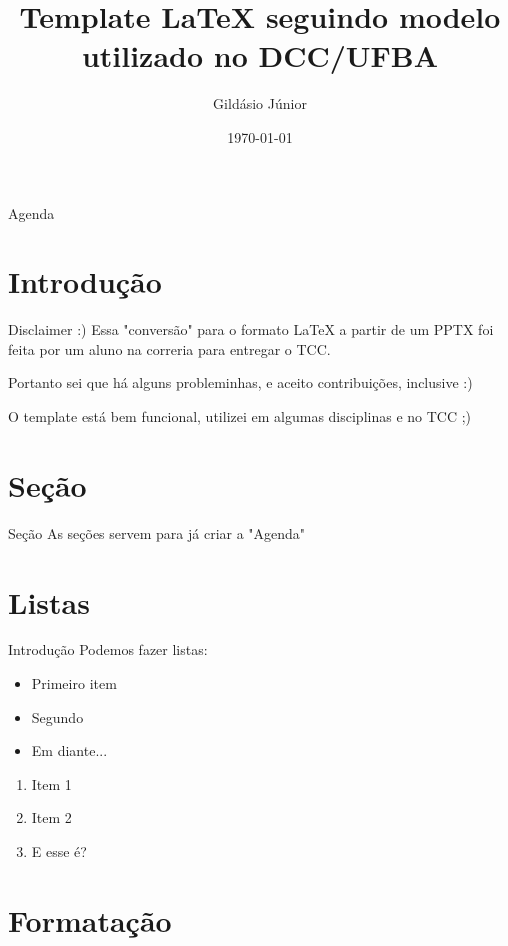 \documentclass[aspectratio=169,xcolor=table]{beamer}
\author{Gildásio Júnior}
\title{Template LaTeX seguindo modelo utilizado no DCC/UFBA}
\institute{Universidade Federal da Bahia}
\date{\today}
\begin{document}
\frame{\maketitle}
\begin{frame}{Agenda}
	\tableofcontents
\end{frame}

\section{Introdução}

\begin{frame}{Disclaimer :)}
    Essa "conversão" para o formato LaTeX \cite{mittelbach2004latex} a partir de
    um PPTX foi feita por um aluno na correria para entregar o TCC.

    Portanto sei que há alguns probleminhas, e aceito contribuições, inclusive :)

    O template está bem funcional, utilizei em algumas disciplinas e no TCC ;)
\end{frame}

\section{Seção}

\begin{frame}{Seção}
    As seções servem para já criar a "Agenda"
\end{frame}

\section{Listas}

\begin{frame}{Introdução}
    Podemos fazer listas:
	\begin{itemize}
		\item Primeiro item
		\item Segundo
        \item Em diante...
	\end{itemize}
	\begin{enumerate}
		\item Item 1
        \item Item 2
		\item E esse é?
	\end{enumerate}
\end{frame}

\section{Formatação}
\end{document}
